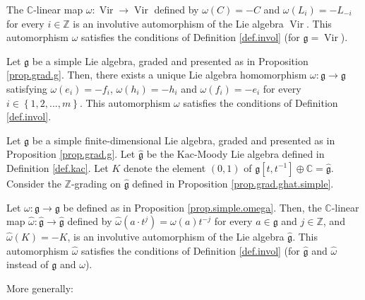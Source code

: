 \documentclass[etingof-lie.tex]{subfiles}
\begin{document}
\begin{proposition}
The $\mathbb{C}$-linear map $\omega:\operatorname*{Vir}\rightarrow
\operatorname*{Vir}$ defined by $\omega\left(  C\right)  =-C$ and
$\omega\left(  L_{i}\right)  =-L_{-i}$ for every $i\in\mathbb{Z}$ is an
involutive automorphism of the Lie algebra $\operatorname*{Vir}$. This
automorphism $\omega$ satisfies the conditions of Definition \ref{def.invol}
(for $\mathfrak{g}=\operatorname*{Vir}$).
\end{proposition}

\begin{proposition}
\label{prop.simple.omega}Let $\mathfrak{g}$ be a simple Lie algebra, graded
and presented as in Proposition \ref{prop.grad.g}. Then, there exists a unique
Lie algebra homomorphism $\omega:\mathfrak{g}\rightarrow\mathfrak{g}$
satisfying $\omega\left(  e_{i}\right)  =-f_{i}$, $\omega\left(  h_{i}\right)
=-h_{i}$ and $\omega\left(  f_{i}\right)  =-e_{i}$ for every $i\in\left\{
1,2,...,m\right\}  $. This automorphism $\omega$ satisfies the conditions of
Definition \ref{def.invol}.
\end{proposition}

\begin{proposition}
Let $\mathfrak{g}$ be a simple finite-dimensional Lie algebra, graded and
presented as in Proposition \ref{prop.grad.g}. Let $\widehat{\mathfrak{g}}$ be
the Kac-Moody Lie algebra defined in Definition \ref{def.kac}. Let $K$ denote
the element $\left(  0,1\right)  $ of $\mathfrak{g}\left[  t,t^{-1}\right]
\oplus\mathbb{C}=\widehat{\mathfrak{g}}$. Consider the $\mathbb{Z}$-grading on
$\widehat{\mathfrak{g}}$ defined in Proposition \ref{prop.grad.ghat.simple}.

Let $\omega:\mathfrak{g}\rightarrow\mathfrak{g}$ be defined as in Proposition
\ref{prop.simple.omega}. Then, the $\mathbb{C}$-linear map $\widehat{\omega
}:\widehat{\mathfrak{g}}\rightarrow\widehat{\mathfrak{g}}$ defined by
$\widehat{\omega}\left(  a\cdot t^{j}\right)  =\omega\left(  a\right)  t^{-j}$
for every $a\in\mathfrak{g}$ and $j\in\mathbb{Z}$, and $\widehat{\omega
}\left(  K\right)  =-K$, is an involutive automorphism of the Lie algebra
$\widehat{\mathfrak{g}}$. This automorphism $\widehat{\omega}$ satisfies the
conditions of Definition \ref{def.invol} (for $\widehat{\mathfrak{g}}$ and
$\widehat{\omega}$ instead of $\mathfrak{g}$ and $\omega$).
\end{proposition}

More generally:
\end{document}
